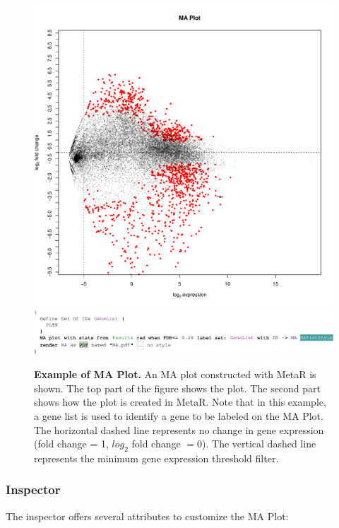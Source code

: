   \begin{figure}[bpt!]
  \centering
  \includegraphics[width=\figWidthNarrow]{figures/MAPlot-1.pdf}
   \includegraphics[width=\figWidthWide]{figures/MAPlotConstruction-1.pdf}
\caption[Example of MA Plot.]{\textbf{Example of MA Plot.} An MA plot constructed with MetaR is shown. The top part of the figure shows the plot. The second part shows how the plot is created in MetaR. Note that in this example, a gene list is used to identify a gene to be labeled on the MA Plot. The horizontal dashed line represents no change in gene expression (fold change = 1, $log_2$ fold change $=0$). The vertical dashed line represents the minimum gene expression threshold filter.}
\label{fig:MAPlot}
\end{figure}

\subsubsection{Inspector}

The inspector offers several attributes to customize the MA Plot:

